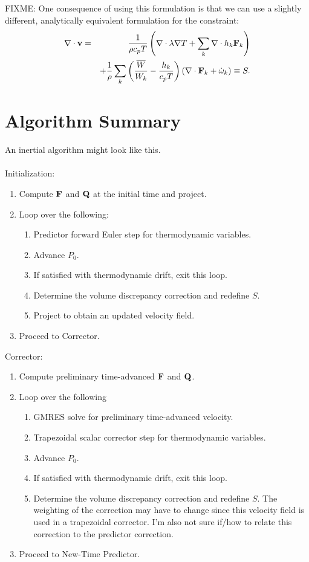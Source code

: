 \documentclass[final]{siamltex}
\def\Fb {{\bf F}}
\def\Qb {{\bf Q}}
\def\vb {{\bf v}}
\begin{document}
FIXME: One consequence of using this formulation is that we can use a slightly different, 
analytically equivalent formulation for the constraint:
\begin{eqnarray}
\nabla\cdot\vb &=& \frac{1}{\rho c_p T}\left(\nabla\cdot\lambda\nabla T + \sum_k\nabla\cdot h_k\Fb_k\right)\nonumber\\
&& + \frac{1}{\rho}\sum_k\left(\frac{\overline{W}}{W_k} - \frac{h_k}{c_p T}\right)\left(\nabla\cdot\Fb_k + \dot\omega_k\right) \equiv S.
\end{eqnarray}

\section{Algorithm Summary}
An inertial algorithm might look like this.\\ \\
Initialization:\\
\begin{enumerate}
\item Compute $\Fb$ and $\Qb$ at the initial time and project.
\item Loop over the following:
\begin{enumerate}
\item Predictor forward Euler step for thermodynamic variables.
\item Advance $P_0$.
\item If satisfied with thermodynamic drift, exit this loop.
\item Determine the volume discrepancy correction and redefine $S$.
\item Project to obtain an updated velocity field.
\end{enumerate}
\item Proceed to Corrector.\\
\end{enumerate}
Corrector:\\
\begin{enumerate}
\item Compute preliminary time-advanced $\Fb$ and $\Qb$.
\item Loop over the following
\begin{enumerate}
\item GMRES solve for preliminary time-advanced velocity.
\item Trapezoidal scalar corrector step for thermodynamic variables.
\item Advance $P_0$.
\item If satisfied with thermodynamic drift, exit this loop.
\item Determine the volume discrepancy correction and redefine $S$.  The weighting of the
correction may have to change since this velocity field is used in a trapezoidal corrector.
I'm also not sure if/how to relate this correction to the predictor correction.
\end{enumerate}
\item Proceed to New-Time Predictor.\\
\end{enumerate}
\end{document}
